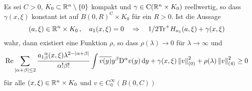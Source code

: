 \begin{lem}
Es sei $C>0$, $K_0\subset\mathbb R^n\setminus\{0\}$ kompakt und $\gamma\in\mathrm C(\mathbb R^n\times K_0)$ reellwertig, so dass $\gamma(x,\xi)$ konstant ist auf $B(0,R)^\mathrm{C}\times K_0$ für ein $R>0$. Ist die Aussage
\begin{align}\label{melinendlemma1}
(a,\xi)\in\mathbb R^n\times K_0\,,\quad a_1(x,\xi)=0 \quad \Rightarrow \quad 1/2 \mathrm{Tr}^+H_{a_1}(a,\xi) + \gamma(x,\xi)
\end{align}
wahr, dann existiert eine Funktion $\rho$, so dass $\rho(\lambda)\to 0$ für $\lambda\to\infty$ und
\begin{align}\label{melinendlemma2}
\operatorname{Re} \sum_{|\alpha+\beta|\le 2} \frac{{a_1}^\alpha_\beta(x,\xi)\lambda^{2-|\alpha+\beta|}}{\alpha!\beta!}\int\overline{v(y)}y^\beta\mathrm D^\alpha v(y)\,\mathrm d y + \gamma(x,\xi)\left\lVert v\right\rVert_{(0)}^2 + \rho(\lambda)\left\lVert v\right\rVert _{(4)}^2 \ge 0
\end{align}
für alle $(x,\xi)\in\mathbb R^n\times K_0$ und $v\in\mathrm C^\infty_0(B(0,C))$
\end{lem}

